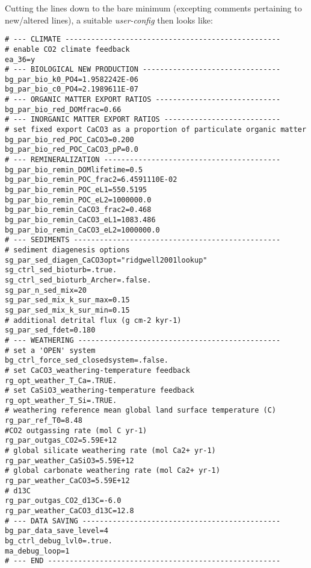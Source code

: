 Cutting the lines down to the bare minimum (excepting comments pertaining to new/altered lines), a suitable \textit{user-config} then looks like:

\scriptsize\begin{verbatim}
# --- CLIMATE --------------------------------------------------
# enable CO2 climate feedback
ea_36=y
# --- BIOLOGICAL NEW PRODUCTION --------------------------------
bg_par_bio_k0_PO4=1.9582242E-06
bg_par_bio_c0_PO4=2.1989611E-07
# --- ORGANIC MATTER EXPORT RATIOS -----------------------------
bg_par_bio_red_DOMfrac=0.66
# --- INORGANIC MATTER EXPORT RATIOS ---------------------------
# set fixed export CaCO3 as a proportion of particulate organic matter
bg_par_bio_red_POC_CaCO3=0.200
bg_par_bio_red_POC_CaCO3_pP=0.0
# --- REMINERALIZATION -----------------------------------------
bg_par_bio_remin_DOMlifetime=0.5
bg_par_bio_remin_POC_frac2=6.4591110E-02
bg_par_bio_remin_POC_eL1=550.5195
bg_par_bio_remin_POC_eL2=1000000.0
bg_par_bio_remin_CaCO3_frac2=0.468
bg_par_bio_remin_CaCO3_eL1=1083.486
bg_par_bio_remin_CaCO3_eL2=1000000.0
# --- SEDIMENTS ------------------------------------------------
# sediment diagenesis options
sg_par_sed_diagen_CaCO3opt="ridgwell2001lookup"
sg_ctrl_sed_bioturb=.true.
sg_ctrl_sed_bioturb_Archer=.false.
sg_par_n_sed_mix=20
sg_par_sed_mix_k_sur_max=0.15
sg_par_sed_mix_k_sur_min=0.15
# additional detrital flux (g cm-2 kyr-1)
sg_par_sed_fdet=0.180
# --- WEATHERING -----------------------------------------------
# set a 'OPEN' system
bg_ctrl_force_sed_closedsystem=.false.
# set CaCO3_weathering-temperature feedback
rg_opt_weather_T_Ca=.TRUE.
# set CaSiO3_weathering-temperature feedback
rg_opt_weather_T_Si=.TRUE.
# weathering reference mean global land surface temperature (C)
rg_par_ref_T0=8.48
#CO2 outgassing rate (mol C yr-1)
rg_par_outgas_CO2=5.59E+12
# global silicate weathering rate (mol Ca2+ yr-1)
rg_par_weather_CaSiO3=5.59E+12
# global carbonate weathering rate (mol Ca2+ yr-1)
rg_par_weather_CaCO3=5.59E+12
# d13C
rg_par_outgas_CO2_d13C=-6.0
rg_par_weather_CaCO3_d13C=12.8
# --- DATA SAVING ----------------------------------------------
bg_par_data_save_level=4
bg_ctrl_debug_lvl0=.true.
ma_debug_loop=1
# --- END ------------------------------------------------------
\end{verbatim}\normalsize

